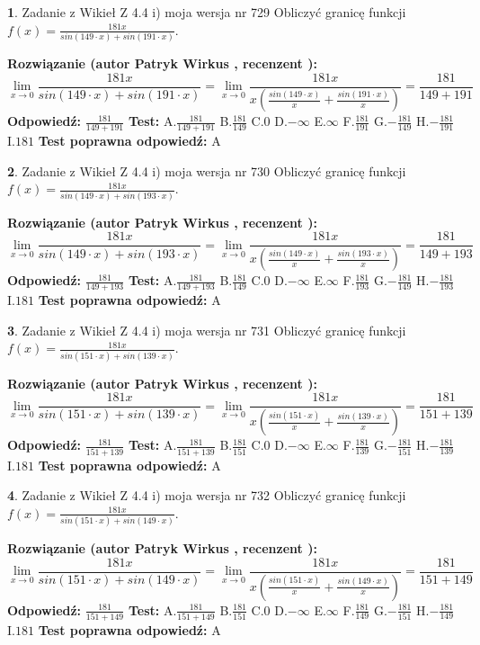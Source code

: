 \documentclass[12pt, a4paper]{article}
\theoremstyle{definition} %
\newtheorem{zad}{}
\newcommand{\zadStart}[1]{\begin{zad}#1\newline}
\newcommand{\zadStop}{\end{zad}}
\newcommand{\rozwStart}[2]{\noindent \textbf{Rozwiązanie (autor #1 , recenzent #2): }\newline}
\newcommand{\rozwStop}{\newline}
\newcommand{\odpStart}{\noindent \textbf{Odpowiedź:}\newline}
\newcommand{\odpStop}{\newline}
\newcommand{\testStart}{\noindent \textbf{Test:}\newline}
\newcommand{\testStop}{\newline}
\newcommand{\kluczStart}{\noindent \textbf{Test poprawna odpowiedź:}\newline}
\newcommand{\kluczStop}{\newline}
\begin{document}
\zadStart{Zadanie z Wikieł Z 4.4 i) moja wersja nr 729}
Obliczyć granicę funkcji $f(x)=\frac{181x}{sin(149\cdot x) +sin(191\cdot x)}$.
\zadStop
\rozwStart{Patryk Wirkus}{}
$$\lim\limits_{x\to 0}\frac{181x}{sin(149\cdot x) +sin(191\cdot x)}=\lim\limits_{x\to 0}\frac{181x}{x(\frac{sin(149\cdot x)}{x}+\frac{sin(191\cdot x)}{x})}=\frac{181}{149+191}$$
\rozwStop
\odpStart
$\frac{181}{149+191}$
\odpStop
\testStart
A.$\frac{181}{149+191}$
B.$\frac{181}{149}$
C.$0$
D.$-\infty$
E.$\infty$
F.$\frac{181}{191}$
G.$-\frac{181}{149}$
H.$-\frac{181}{191}$
I.$181$
\testStop
\kluczStart
A
\kluczStop



\zadStart{Zadanie z Wikieł Z 4.4 i) moja wersja nr 730}
Obliczyć granicę funkcji $f(x)=\frac{181x}{sin(149\cdot x) +sin(193\cdot x)}$.
\zadStop
\rozwStart{Patryk Wirkus}{}
$$\lim\limits_{x\to 0}\frac{181x}{sin(149\cdot x) +sin(193\cdot x)}=\lim\limits_{x\to 0}\frac{181x}{x(\frac{sin(149\cdot x)}{x}+\frac{sin(193\cdot x)}{x})}=\frac{181}{149+193}$$
\rozwStop
\odpStart
$\frac{181}{149+193}$
\odpStop
\testStart
A.$\frac{181}{149+193}$
B.$\frac{181}{149}$
C.$0$
D.$-\infty$
E.$\infty$
F.$\frac{181}{193}$
G.$-\frac{181}{149}$
H.$-\frac{181}{193}$
I.$181$
\testStop
\kluczStart
A
\kluczStop



\zadStart{Zadanie z Wikieł Z 4.4 i) moja wersja nr 731}
Obliczyć granicę funkcji $f(x)=\frac{181x}{sin(151\cdot x) +sin(139\cdot x)}$.
\zadStop
\rozwStart{Patryk Wirkus}{}
$$\lim\limits_{x\to 0}\frac{181x}{sin(151\cdot x) +sin(139\cdot x)}=\lim\limits_{x\to 0}\frac{181x}{x(\frac{sin(151\cdot x)}{x}+\frac{sin(139\cdot x)}{x})}=\frac{181}{151+139}$$
\rozwStop
\odpStart
$\frac{181}{151+139}$
\odpStop
\testStart
A.$\frac{181}{151+139}$
B.$\frac{181}{151}$
C.$0$
D.$-\infty$
E.$\infty$
F.$\frac{181}{139}$
G.$-\frac{181}{151}$
H.$-\frac{181}{139}$
I.$181$
\testStop
\kluczStart
A
\kluczStop



\zadStart{Zadanie z Wikieł Z 4.4 i) moja wersja nr 732}
Obliczyć granicę funkcji $f(x)=\frac{181x}{sin(151\cdot x) +sin(149\cdot x)}$.
\zadStop
\rozwStart{Patryk Wirkus}{}
$$\lim\limits_{x\to 0}\frac{181x}{sin(151\cdot x) +sin(149\cdot x)}=\lim\limits_{x\to 0}\frac{181x}{x(\frac{sin(151\cdot x)}{x}+\frac{sin(149\cdot x)}{x})}=\frac{181}{151+149}$$
\rozwStop
\odpStart
$\frac{181}{151+149}$
\odpStop
\testStart
A.$\frac{181}{151+149}$
B.$\frac{181}{151}$
C.$0$
D.$-\infty$
E.$\infty$
F.$\frac{181}{149}$
G.$-\frac{181}{151}$
H.$-\frac{181}{149}$
I.$181$
\testStop
\kluczStart
A
\kluczStop
\end{document}
